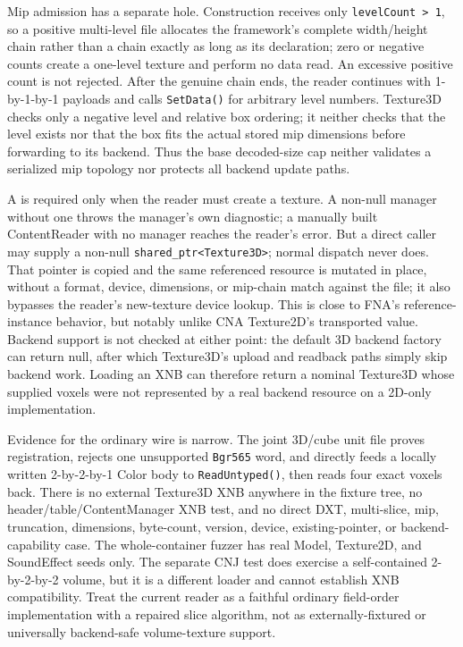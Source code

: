 Mip admission has a separate hole. Construction receives only \texttt{levelCount > 1}, so a
positive multi-level file allocates the framework's complete width/height chain rather than a
chain exactly as long as its declaration; zero or negative counts create a one-level texture and
perform no data read. An excessive positive count is not rejected. After the genuine chain ends,
the reader continues with 1-by-1-by-1 payloads and calls \texttt{SetData()} for arbitrary level
numbers. Texture3D checks only a negative level and relative box ordering; it neither checks that
the level exists nor that the box fits the actual stored mip dimensions before forwarding to its
backend. Thus the base decoded-size cap neither validates a serialized mip topology nor protects
all backend update paths.

A  is required only when the reader must create a texture. A non-null
manager without one throws the manager's own diagnostic; a manually built ContentReader with no
manager reaches the reader's error. But a direct caller may supply a non-null
\texttt{shared\_ptr<Texture3D>}; normal dispatch never does. That pointer is copied and the same
referenced resource is mutated in place, without a format, device, dimensions, or mip-chain match
against the file; it also bypasses the reader's new-texture device lookup. This is close to FNA's
reference-instance behavior, but notably unlike CNA Texture2D's transported value. Backend
support is not checked at either point: the default 3D backend factory can return null, after
which Texture3D's upload and readback paths simply skip backend work. Loading an XNB can therefore
return a nominal Texture3D whose supplied voxels were not represented by a real backend resource
on a 2D-only implementation.

Evidence for the ordinary wire is narrow. The joint 3D/cube unit file proves registration,
rejects one unsupported \texttt{Bgr565} word, and directly feeds a locally written 2-by-2-by-1
Color body to \texttt{ReadUntyped()}, then reads four exact voxels back. There is no external
Texture3D XNB anywhere in the fixture tree, no header/table/ContentManager XNB test, and no
direct DXT, multi-slice, mip, truncation, dimensions, byte-count, version, device, existing-pointer,
or backend-capability case. The whole-container fuzzer has real Model, Texture2D, and SoundEffect
seeds only. The separate CNJ test does exercise a self-contained 2-by-2-by-2 volume, but it is a
different loader and cannot establish XNB compatibility. Treat the current reader as a faithful
ordinary field-order implementation with a repaired slice algorithm, not as externally-fixtured
or universally backend-safe volume-texture support.

